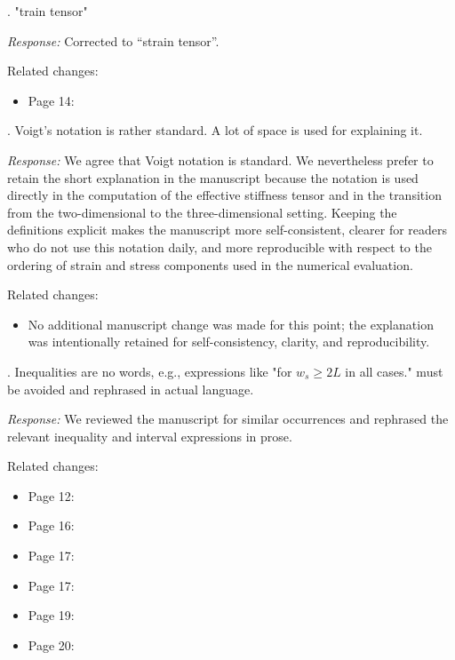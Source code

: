 \documentclass[pdflatex,sn-mathphys-num]{sn-jnl}
\begin{document}
\bigskip

. "train tensor"

\emph{Response:} Corrected to ``strain tensor''.

Related changes:
\begin{itemize}
\item Page 14:  
\end{itemize}

\bigskip

. Voigt's notation is rather standard. A lot of space is used for explaining it.

\emph{Response:} We agree that Voigt notation is standard. We nevertheless prefer to retain the short explanation in the manuscript because the notation is used directly in the computation of the effective stiffness tensor and in the transition from the two-dimensional to the three-dimensional setting. Keeping the definitions explicit makes the manuscript more self-consistent, clearer for readers who do not use this notation daily, and more reproducible with respect to the ordering of strain and stress components used in the numerical evaluation.

Related changes:
\begin{itemize}
\item No additional manuscript change was made for this point; the explanation was intentionally retained for self-consistency, clarity, and reproducibility.
\end{itemize}

\bigskip

. Inequalities are no words, e.g., expressions like "for $w_s \geq 2L$ in all cases." must be avoided and rephrased in actual language.

\emph{Response:} We reviewed the manuscript for similar occurrences and rephrased the relevant inequality and interval expressions in prose.

Related changes:
\begin{itemize}
\item Page 12:  
\item Page 16:  
\item Page 17:  
\item Page 17:  
\item Page 19:  
\item Page 20:  
\end{itemize}
\end{document}
